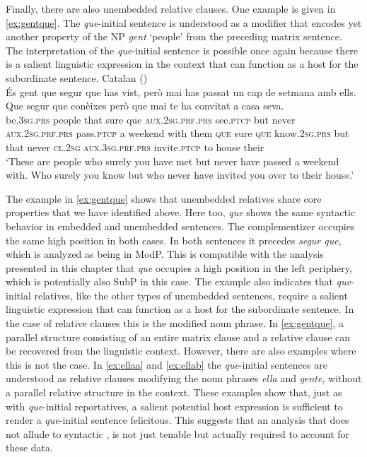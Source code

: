 Finally, there are also unembedded relative clauses. One example is given in \eqref{ex:gentque}. The  \emph{que}-initial sentence  is understood as a modifier  that encodes yet another property of the NP \emph{gent} `people' from
the preceding matrix sentence. The interpretation of the \emph{que}-initial sentence is possible once again because there is a salient linguistic expression in the context that can
function as a host for the subordinate sentence.
\ea \label{ex:gentque} 
Catalan (\citealt[52: ex 103]{Kocher2017a})\\ 
\gll  És gent que segur que has vist, però mai has passat un {cap de setmana} amb ells. Que segur que conèixes però que mai te ha convitat a casa seva. \\
	be.\textsc{3sg.prs} people that sure que \textsc{aux.2sg.prf.prs} see.\textsc{ptcp} but never \textsc{aux.2sg.prf.prs} pass.\textsc{ptcp} a weekend
	with
them \textsc{que} sure \textsc{que} know.\textsc{2sg.prs}
	but that never \textsc{cl.2sg} \textsc{aux.3sg.prf.prs} invite.\textsc{ptcp} to house their
\\
	\glt `These are people who surely you have met but never have passed a weekend with. 	Who surely you know but who never have invited you over to their house.' 
\z


The example in \eqref{ex:gentque} shows that unembedded relatives share core properties that we have identified
above. Here too, \emph{que} shows the same syntactic behavior in embedded and unembedded
sentences. The complementizer occupies the same high position in both cases. In both
 sentences it precedes \emph{segur que}, which is analyzed as being in ModP. This is compatible with the analysis
presented in this chapter that \emph{que} occupies a high position in the left periphery, which is potentially also  SubP in this case.
The example also indicates that \emph{que}-initial relatives, like the other types of unembedded
sentences, require a salient linguistic expression that can function as a host for the subordinate
sentence. In the case of relative clauses this is the modified noun phrase. In \eqref{ex:gentque}, a parallel structure consisting of  an entire matrix clause and a relative clause can be recovered from the linguistic context.  However, there are also examples where this is not the case. In \eqref{ex:ellaa} and \eqref{ex:ellab} the \emph{que}-initial sentences are understood as relative clauses modifying the noun phrases \emph{ella} and  \emph{gente}, without a parallel relative structure in the context. These examples show that, just as with \emph{que}-initial reportatives,  a salient potential host expression is sufficient to render a \emph{que}-initial sentence  felicitous. This suggests  that an analysis that does not allude to syntactic , is not just tenable but actually required to account for these data.



